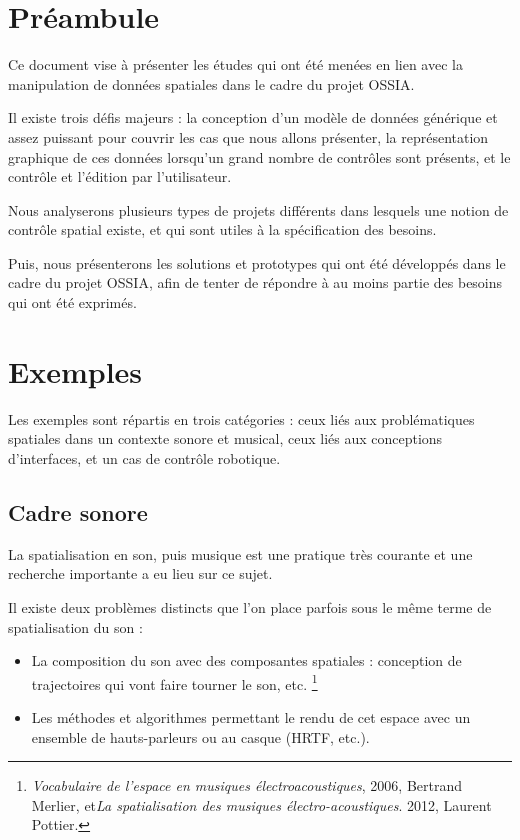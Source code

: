\documentclass[french,12pt]{article}
\begin{document}
\section{Préambule}
Ce document vise à présenter les études qui ont été menées en lien avec 
la manipulation de données spatiales dans le cadre du projet OSSIA.

Il existe trois défis majeurs : la conception d'un modèle de données générique et assez puissant pour couvrir les cas que nous allons présenter, la représentation graphique de ces données lorsqu'un grand nombre de contrôles sont présents, et le contrôle et l'édition par l'utilisateur.

Nous analyserons plusieurs types de projets différents dans lesquels une notion
de contrôle spatial existe, et qui sont utiles à la spécification des besoins.

Puis, nous présenterons les solutions et prototypes qui ont été développés dans le cadre du projet OSSIA, afin de tenter de répondre à au moins partie des besoins qui ont été exprimés.

\section{Exemples}
Les exemples sont répartis en trois catégories : ceux liés aux problématiques spatiales dans un contexte sonore et musical, ceux liés aux conceptions d'interfaces, et un cas de contrôle robotique.

\subsection{Cadre sonore}
La spatialisation en son, puis musique est une pratique très courante et une recherche importante a eu lieu sur ce sujet.

Il existe deux problèmes distincts que l'on place parfois sous le même terme de spatialisation du son : 
\begin{itemize}
\item La composition du son avec des composantes spatiales : conception de trajectoires qui vont faire tourner le son, etc. \footnote{\textit{Vocabulaire de l'espace en musiques électroacoustiques}, 2006, Bertrand Merlier, et\textit{La spatialisation des musiques électro-acoustiques}. 2012, Laurent Pottier.}
\item Les méthodes et algorithmes permettant le rendu de cet espace avec un ensemble de hauts-parleurs ou au casque (HRTF, etc.).
\end{itemize}
\end{document}
